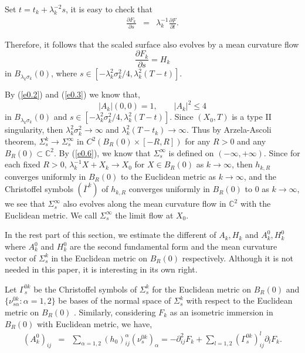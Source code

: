 Set $t=t_k+\lambda_k^{-2}s$, it is easy to check that
\begin{eqnarray*}
\frac{\partial F_k}{\partial s}&=&\lambda_k^{-1}\frac{\partial
F}{\partial t}.
\end{eqnarray*}

Therefore, it follows that the scaled surface also evolves by a
mean curvature flow
\begin{equation}\label{e0.1} \frac{\partial F_k}{\partial s}=H_k
\end{equation} in $B_{\lambda_k\sigma_k}(0)$, where $s\in [-\lambda_k^2\sigma_k^2/4,
\lambda_k^2(T-t)].
$

By (\ref{e0.2}) and (\ref{e0.3}) we know that,
$$|A_k|(0, 0)=1,~~~~~~~~~|A_k|^2\leq 4$$ in $B_{\lambda_k\sigma_k}(0)$
and $s\in [-\lambda_k^2\sigma_k^2/4, \lambda_k^2(T-t)]. $ Since
$(X_0, T)$ is a type II singularity, then
$\lambda_k^2\sigma_k^2\to\infty$ and
$\lambda_k^2(T-t_k)\to\infty$.  Thus by Arzela-Ascoli theorem,
$\Sigma^k_s\to\Sigma^\infty_s$ in $C^2(B_R(0)\times [-R, R])$ for
any $R>0$ and any $B_R(0)\subset {\mathbb {C}}^2$. By
(\ref{e0.6}), we know that $\Sigma^\infty_s$ is defined on
$(-\infty, +\infty)$. Since for each fixed $R>0$,
$\lambda_k^{-1}X+X_k\to X_0$ for $X\in B_R(0)$ as $k\to \infty$,
then $h_{k, R}$ converges uniformly in $B_R(0)$ to the Euclidean
metric as $k\to \infty$, and the Christoffel symbols
$(\bar\Gamma^k)$ of $h_{k, R}$ converges uniformly in $B_R(0)$ to
$0$ as $k\to\infty$, we see that $\Sigma^\infty_s$ also evolves
along the mean curvature flow in ${\mathbb{C}}^2$ with the
Euclidean metric. We call $\Sigma^\infty_s$ the limit flow at
$X_0$.

In the rest part of this section, we estimate the different of
$A_k, H_k$ and $A_k^0, H_k^0$ where $A^0_k$ and $H^0_k$ are the
second fundamental form and the mean curvature vector of
$\Sigma^k_s$ in the Euclidean metric on $B_R(0)$ respectively.
Although it is not needed in this paper, it is interesting in its
own right.

 Let $\Gamma^{0k}_s$
be the Christoffel symbols of $\Sigma^k_s$ for the Euclidean
metric on $B_R(0)$ and $\{\nu^{0k}_{s\alpha}: \alpha=1, 2\}$ be
bases of the normal space of $\Sigma^k_s$ with respect to the
Euclidean metric on $B_R(0)$ . Similarly, considering $F_k$ as an
isometric immersion in $B_R(0)$ with Euclidean metric, we have,
\begin{eqnarray}\label{e0.5}
(A^0_k)_{ij} &=& \sum_{\alpha=1,
2}(h_0)^\alpha_{ij}(\nu^{0k}_s)_\alpha=-\partial^2_{ij}
F_k+\sum_{l=1, 2}(\Gamma^{0k}_s)^l_{ij}\partial_l F_k.
\end{eqnarray}

